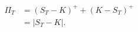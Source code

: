 \documentclass{equation-sheet}
\begin{document}
\begin{equation*}
\begin{aligned}
\Pi_T
  &= (S_T-K)^{+} + (K-S_T)^{+} \\[0.65em]
  &= \lvert S_T-K\rvert.
\end{aligned}
\end{equation*}
\end{document}
